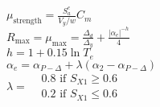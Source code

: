 \(\mu_{\text {strength}}=\frac{S_{a}^{e}}{V_{y} / w} C_{m}\)\\
\(R_{\max }=\mu_{\max }=\frac{\Delta_{d}}{\Delta_{y}}+\frac{\left|\alpha_{e}\right|^{-h}}{4}\)\\
\(h =1+0.15 \ln T_{e}\)\\
\(\alpha_{e} =\alpha_{P-\Delta}+\lambda\left(\alpha_{2}-\alpha_{P-\Delta}\right)\)\\
\(\lambda = \begin{aligned} &0.8 \text { if } S_{X 1} \geq 0.6\\ &0.2 \text { if } S_{X 1} \leq 0.6 \end{aligned}\)
